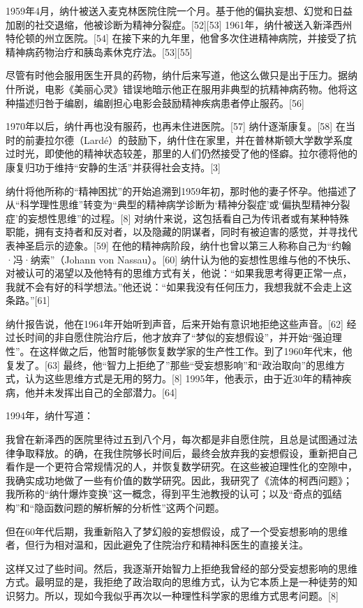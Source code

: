 1959年4月，纳什被送入麦克林医院住院一个月。基于他的偏执妄想、幻觉和日益加剧的社交退缩，他被诊断为精神分裂症。[52][53] 1961年，纳什被送入新泽西州特伦顿的州立医院。[54] 在接下来的九年里，他曾多次住进精神病院，并接受了抗精神病药物治疗和胰岛素休克疗法。[53][55]

尽管有时他会服用医生开具的药物，纳什后来写道，他这么做只是出于压力。据纳什所说，电影《美丽心灵》错误地暗示他正在服用非典型的抗精神病药物。他将这种描述归咎于编剧，编剧担心电影会鼓励精神疾病患者停止服药。[56]

1970年以后，纳什再也没有服药，也再未住进医院。[57] 纳什逐渐康复。[58] 在当时的前妻拉尔德（Lardé）的鼓励下，纳什住在家里，并在普林斯顿大学数学系度过时光，即使他的精神状态较差，那里的人们仍然接受了他的怪癖。拉尔德将他的康复归功于维持“安静的生活”并获得社会支持。[3]

纳什将他所称的“精神困扰”的开始追溯到1959年初，那时他的妻子怀孕。他描述了从“科学理性思维”转变为“典型的精神病学诊断为‘精神分裂症’或‘偏执型精神分裂症’的妄想性思维”的过程。[8] 对纳什来说，这包括看自己为传讯者或有某种特殊职能，拥有支持者和反对者，以及隐藏的阴谋者，同时有被迫害的感觉，并寻找代表神圣启示的迹象。[59] 在他的精神病阶段，纳什也曾以第三人称称自己为“约翰·冯·纳索”（Johann von Nassau）。[60] 纳什认为他的妄想性思维与他的不快乐、对被认可的渴望以及他特有的思维方式有关，他说：“如果我思考得更正常一点，我就不会有好的科学想法。”他还说：“如果我没有任何压力，我想我就不会走上这条路。”[61]

纳什报告说，他在1964年开始听到声音，后来开始有意识地拒绝这些声音。[62] 经过长时间的非自愿住院治疗后，他才放弃了“梦似的妄想假设”，并开始“强迫理性”。在这样做之后，他暂时能够恢复数学家的生产性工作。到了1960年代末，他复发了。[63] 最终，他“智力上拒绝了”那些“受妄想影响”和“政治取向”的思维方式，认为这些思维方式是无用的努力。[8] 1995年，他表示，由于近30年的精神疾病，他并未发挥出自己的全部潜力。[64]

1994年，纳什写道：

我曾在新泽西的医院里待过五到八个月，每次都是非自愿住院，且总是试图通过法律争取释放。的确，在我住院够长时间后，最终会放弃我的妄想假设，重新把自己看作是一个更符合常规情况的人，并恢复数学研究。在这些被迫理性化的空隙中，我确实成功地做了一些有价值的数学研究。因此，我研究了《流体的柯西问题》；我所称的“纳什爆炸变换”这一概念，得到平生池教授的认可；以及“奇点的弧结构”和“隐函数问题的解析解的分析性”这两个问题。

但在60年代后期，我重新陷入了梦幻般的妄想假设，成了一个受妄想影响的思维者，但行为相对温和，因此避免了住院治疗和精神科医生的直接关注。

这样又过了些时间。然后，我逐渐开始智力上拒绝我曾经的部分受妄想影响的思维方式。最明显的是，我拒绝了政治取向的思维方式，认为它本质上是一种徒劳的知识努力。所以，现如今我似乎再次以一种理性科学家的思维方式思考问题。[8]